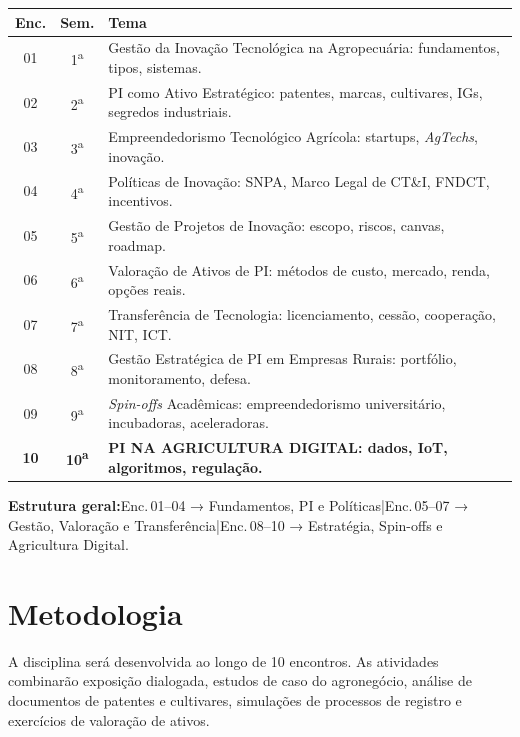 \documentclass[11pt,a4paper]{article}
\begin{document}
\begin{small}
\renewcommand{\arraystretch}{1.35}
\begin{tabularx}{\textwidth}{@{}c c X@{}}
\toprule
\textbf{Enc.} & \textbf{Sem.} & \textbf{Tema} \\
\midrule
01 & 1\textsuperscript{a} & Gestão da Inovação Tecnológica na Agropecuária: fundamentos, tipos, sistemas. \\
02 & 2\textsuperscript{a} & PI como Ativo Estratégico: patentes, marcas, cultivares, IGs, segredos industriais. \\
03 & 3\textsuperscript{a} & Empreendedorismo Tecnológico Agrícola: startups, \textit{AgTechs}, inovação. \\
04 & 4\textsuperscript{a} & Políticas de Inovação: SNPA, Marco Legal de CT\&I, FNDCT, incentivos. \\
05 & 5\textsuperscript{a} & Gestão de Projetos de Inovação: escopo, riscos, canvas, roadmap. \\
06 & 6\textsuperscript{a} & Valoração de Ativos de PI: métodos de custo, mercado, renda, opções reais. \\
07 & 7\textsuperscript{a} & Transferência de Tecnologia: licenciamento, cessão, cooperação, NIT, ICT. \\
08 & 8\textsuperscript{a} & Gestão Estratégica de PI em Empresas Rurais: portfólio, monitoramento, defesa. \\
09 & 9\textsuperscript{a} & \textit{Spin-offs} Acadêmicas: empreendedorismo universitário, incubadoras, aceleradoras. \\
\rowcolor{uefslight!70!white}
\textbf{10} & \textbf{10\textsuperscript{a}} & \textbf{\textsf{PI NA AGRICULTURA DIGITAL}: dados, IoT, algoritmos, regulação.} \\
\bottomrule
\end{tabularx}
\end{small}

\begin{tcolorbox}[uefsbox]
\textbf{Estrutura geral:}\enspace Enc.\,01--04 → Fundamentos, PI e Políticas\enspace|\enspace Enc.\,05--07 → Gestão, Valoração e Transferência\enspace|\enspace Enc.\,08--10 → Estratégia, Spin-offs e Agricultura Digital.
\end{tcolorbox}


\section*{Metodologia}

A disciplina será desenvolvida ao longo de 10 encontros. As atividades combinarão exposição dialogada, estudos de caso do agronegócio, análise de documentos de patentes e cultivares, simulações de processos de registro e exercícios de valoração de ativos.
\end{document}
